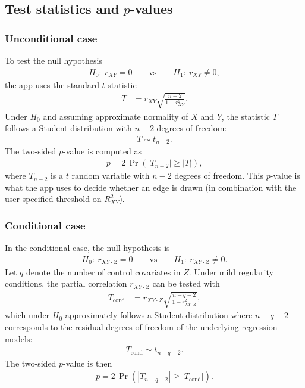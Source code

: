 \documentclass[11pt,a4paper]{article}
\begin{document}
\subsection{Test statistics and $p$-values}

\subsubsection*{Unconditional case}

To test the null hypothesis
\begin{align}
H_0:\ r_{XY} = 0
\qquad
\text{vs}
\qquad
H_1:\ r_{XY} \neq 0,
\end{align}
the app uses the standard $t$-statistic
\begin{align}
T
&=
r_{XY}
\sqrt{
\frac{n-2}{1-r_{XY}^2}
}.
\end{align}
Under $H_0$ and assuming approximate normality of $X$ and $Y$, the statistic $T$ follows a Student distribution with $n-2$ degrees of freedom:
\begin{align}
T \sim t_{n-2}.
\end{align}
The two-sided $p$-value is computed as
\begin{align}
p
=
2\,\Pr\left( |T_{n-2}| \ge |T| \right),
\end{align}
where $T_{n-2}$ is a $t$ random variable with $n-2$ degrees of freedom. This $p$-value is what the app uses to decide whether an edge is drawn (in combination with the user-specified threshold on $R^2_{XY}$).

\subsubsection*{Conditional case}

In the conditional case, the null hypothesis is
\begin{align}
H_0:\ r_{XY\cdot Z} = 0
\qquad
\text{vs}
\qquad
H_1:\ r_{XY\cdot Z} \neq 0.
\end{align}
Let $q$ denote the number of control covariates in $Z$. Under mild regularity conditions, the partial correlation $r_{XY\cdot Z}$ can be tested with
\begin{align}
T_{\text{cond}}
&=
r_{XY\cdot Z}
\sqrt{
\frac{n-q-2}{1-r_{XY\cdot Z}^2}
},
\end{align}
which under $H_0$ approximately follows a Student distribution where $n-q-2$ corresponds to the residual degrees of freedom of the underlying regression models:
\begin{align}
T_{\text{cond}} \sim t_{n-q-2}.
\end{align}
The two-sided $p$-value is then
\begin{align}
p
=
2\,\Pr\left( |T_{n-q-2}| \ge |T_{\text{cond}}| \right).
\end{align}
\end{document}
